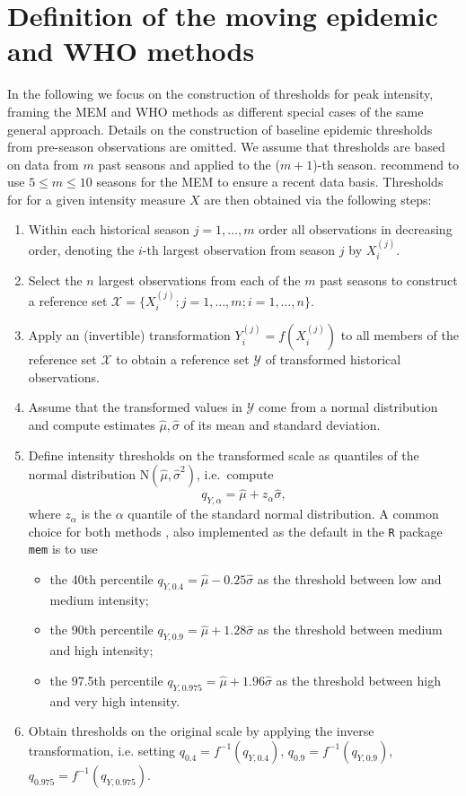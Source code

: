 \documentclass{article}
\begin{document}
\section{Definition of the moving epidemic and WHO methods}
\label{sec:definitions}

In the following we focus on the construction of thresholds  for peak intensity, framing the MEM and WHO methods as different special cases of the same general approach. Details on the construction of baseline epidemic thresholds from pre-season observations are omitted. We assume that thresholds are based on data from $m$ past seasons and applied to the ($m + 1$)-th season. \cite{Vega2015} recommend to use $5 \leq m \leq 10$ seasons for the MEM to ensure a recent data basis. Thresholds for for a given intensity measure $X$ are then obtained via the following steps:

\begin{enumerate}
\item Within each historical season $j = 1, \dots, m$ order all observations in decreasing order, denoting the $i$-th largest observation from season $j$ by $X^{(j)}_i$.
\item Select the $n$ largest observations from each of the $m$ past seasons to construct a reference set $\mathcal{X} = \{X_i^{(j)}; j = 1, \dots, m; i = 1, \dots, n\}$.
\item Apply an (invertible) transformation $Y_i^{(j)} = f(X_i^{(j)})$ to all members of the reference set $\mathcal{X}$ to obtain a reference set $\mathcal{Y}$ of transformed historical observations.
\item Assume that the transformed values in $\mathcal{Y}$ come from a normal distribution and compute estimates $\hat\mu, \hat \sigma$ of its mean and standard deviation.
\item Define intensity thresholds on the transformed scale as quantiles of the normal distribution N$(\hat\mu, \hat\sigma^2)$, i.e.\ compute
$$
q_{Y, \alpha} = \hat{\mu} + z_\alpha \hat{\sigma},
$$
where $z_\alpha$ is the $\alpha$ quantile of the standard normal distribution. A common choice for both methods \citep{WHO2017}, also implemented as the default in the \texttt{R} package \texttt{mem} \citep{Lozano2020} is to use
\begin{itemize}
\item the 40th percentile $q_{Y, 0.4} = \hat\mu - 0.25 \hat\sigma$ as the threshold between low and medium intensity;
\item the 90th percentile $q_{Y, 0.9} = \hat\mu + 1.28 \hat\sigma$ as the threshold between medium and high intensity;
\item the 97.5th percentile $q_{Y, 0.975} = \hat\mu + 1.96\hat\sigma$ as the threshold between high and very high intensity.
\end{itemize}
\item Obtain thresholds on the original scale by applying the inverse transformation, i.e. setting $q_{0.4} = f^{-1}(q_{Y, 0.4})$, $q_{0.9} = f^{-1}(q_{Y, 0.9})$, $q_{0.975} = f^{-1}(q_{Y, 0.975})$.
\end{enumerate}
\end{document}
